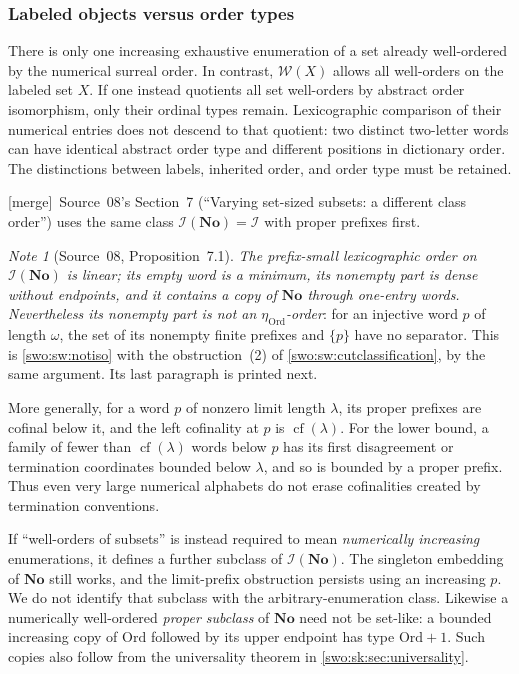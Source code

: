 \documentclass[11pt]{article}
\theoremstyle{definition}
\theoremstyle{remark}
\newtheorem{note}[note]{Note}
\newcommand{\No}{\mathbf{No}}
\newcommand{\Ord}{\mathrm{Ord}}
\newcommand{\WO}{\mathcal W}
\newcommand{\Words}{\mathcal I}
\newcommand{\I}{\mathcal I}
\newcommand{\cf}{\operatorname{cf}}
\newcommand{\merge}{\textsf{[merge]}}
\begin{document}
\subsubsection{Labeled objects versus order types}
There is only one increasing exhaustive enumeration of a set already
well-ordered by the numerical surreal order. In contrast, $\WO(X)$
allows all well-orders on the labeled set $X$. If one instead quotients
all set well-orders by abstract order isomorphism, only their ordinal
types remain. Lexicographic comparison of their numerical entries does
not descend to that quotient: two distinct two-letter words can have
identical abstract order type and different positions in dictionary
order. The distinctions between labels, inherited order, and order type
must be retained.


\merge\ Source~08's Section~7 (``Varying set-sized subsets: a different class
order'')\label{swo:sk:sec:varying} uses the same class $\I(\No)=\Words$ with
proper prefixes first.

\begin{note}[Source~08, Proposition~7.1]\label{swo:sk:prop:words}
\emph{The prefix-small lexicographic order on $\I(\No)$ is linear; its empty
word is a minimum, its nonempty part is dense without endpoints, and it
contains a copy of $\No$ through one-entry words. Nevertheless its nonempty
part is not an $\eta_{\Ord}$-order}: for an injective word $p$ of length
$\omega$, the set of its nonempty finite prefixes and $\{p\}$ have no
separator. This is \cref{swo:sw:notiso} with the obstruction~(2) of
\cref{swo:sw:cutclassification}, by the same argument. Its last paragraph is
printed next.
\end{note}

More generally, for a word $p$ of nonzero limit length $\lambda$, its
proper prefixes are cofinal below it, and the left cofinality at $p$
is $\cf(\lambda)$. For the lower bound, a family of fewer than
$\cf(\lambda)$ words below $p$ has its first disagreement or termination
coordinates bounded below $\lambda$, and so is bounded by a proper
prefix. Thus even very large numerical alphabets do not erase
cofinalities created by termination conventions.

If ``well-orders of subsets'' is instead required to mean
\emph{numerically increasing} enumerations, it defines a further
subclass of $\I(\No)$. The singleton embedding of $\No$ still works,
and the limit-prefix obstruction persists using an increasing $p$.
We do not identify that subclass with the arbitrary-enumeration class.
Likewise a numerically well-ordered \emph{proper subclass} of $\No$
need not be set-like: a bounded increasing copy of $\Ord$ followed by
its upper endpoint has type $\Ord+1$. Such copies also follow from the
universality theorem in \cref{swo:sk:sec:universality}.
\end{document}
